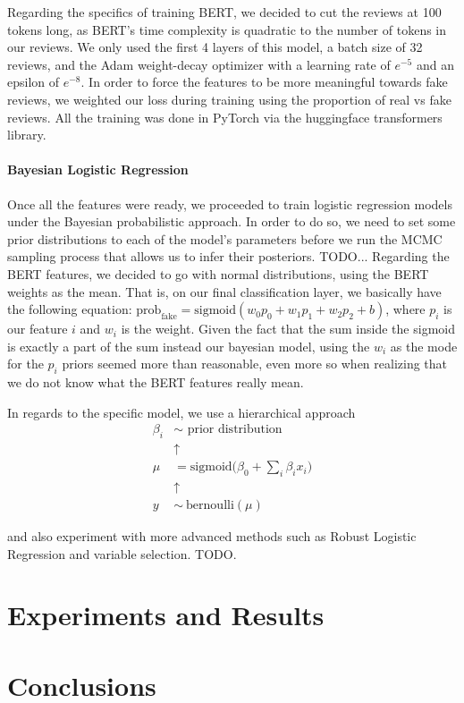 \documentclass[man, floatsintext, 10pt]{apa6}
\begin{document}
Regarding the specifics of training BERT, we decided to cut the reviews at 100 tokens long, as BERT's time complexity is quadratic to the number of tokens in our reviews. We only used the first 4 layers of this model, a batch size of 32 reviews, and the Adam weight-decay optimizer with a learning rate of $e^{-5}$ and an epsilon of $e^{-8}$. In order to force the features to be more meaningful towards fake reviews, we weighted our loss during training using the proportion of real vs fake reviews. All the training was done in PyTorch via the huggingface transformers library.

\vspace{2mm}

\paragraph{Bayesian Logistic Regression} Once all the features were ready, we proceeded to train logistic regression models under the Bayesian probabilistic approach. In order to do so, we need to set some prior distributions to each of the model's parameters before we run the MCMC sampling process that allows us to infer their posteriors. TODO... Regarding the BERT features, we decided to go with normal distributions, using the BERT weights as the mean. That is, on our final classification layer, we basically have the following equation: $\text{prob}_{\text{fake}} = \text{sigmoid} (w_0 p_0 + w_1 p_1 + w_2 p_2 + b)$, where $p_i$ is our feature $i$ and $w_i$ is the weight. Given the fact that the sum inside the sigmoid is exactly a part of the sum instead our bayesian model, using the $w_i$ as the mode for the $p_i$ priors seemed more than reasonable, even more so when realizing that we do not know what the BERT features really mean.

In regards to the specific model, we use a hierarchical approach 
\begin{equation}
\begin{split}
\beta_i & \sim \text{ prior distribution} \\
& \uparrow \\
\mu & = \text{sigmoid}\Bigg(\beta_0 + \sum_i \beta_i x_i \Bigg) \\
& \uparrow \\
y & \sim\ \text{bernoulli} (\mu)
\end{split}
\end{equation}

and also experiment with more advanced methods such as Robust Logistic Regression and variable selection. TODO.

\section{Experiments and Results}

\section{Conclusions}
\end{document}
